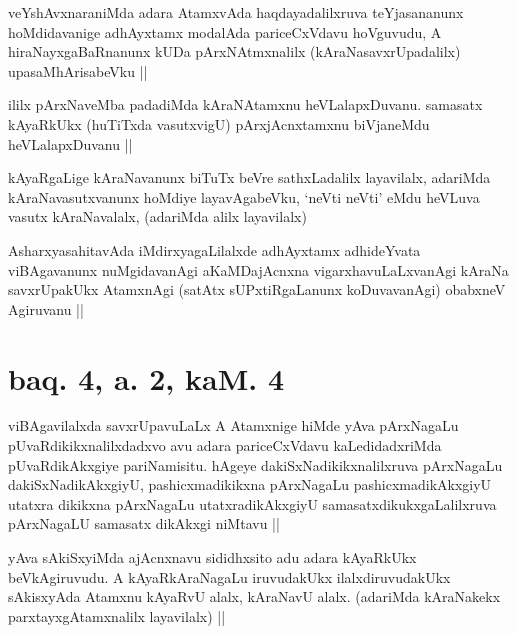 
\begin{artha}
veYshAvxnaraniMda adara AtamxvAda haqdayadalilxruva teYjasananunx hoMdidavanige adhAyxtamx modalAda pariceCxVdavu hoVguvudu, A hiraNayxgaBaRnanunx kUDa pArxNAtmxnalilx (kAraNasavxrUpadalilx) upasaMhArisabeVku ||
\end{artha}


\begin{artha}
ililx pArxNaveMba padadiMda kAraNAtamxnu heVLalapxDuvanu. samasatx kAyaRkUkx (huTiTxda vasutxvigU) pArxjAcnxtamxnu biVjaneMdu heVLalapxDuvanu ||
\end{artha}


\begin{artha}
kAyaRgaLige kAraNavanunx biTuTx beVre sathxLadalilx layavilalx, adariMda kAraNavasutxvanunx hoMdiye layavAgabeVku, `neVti neVti' eMdu heVLuva vasutx kAraNavalalx, (adariMda alilx layavilalx)
\end{artha}


\begin{artha}
AsharxyasahitavAda iMdirxyagaLilalxde adhAyxtamx adhideYvata viBAgavanunx nuMgidavanAgi aKaMDajAcnxna vigarxhavuLaLxvanAgi kAraNa savxrUpakUkx AtamxnAgi (satAtx sUPxtiRgaLanunx koDuvavanAgi) obabxneV Agiruvanu ||
\end{artha}

\section*{baq. 4, a. 2, kaM. 4}

\begin{artha}
viBAgavilalxda savxrUpavuLaLx A Atamxnige hiMde yAva pArxNagaLu pUvaRdikikxnalilxdadxvo avu adara pariceCxVdavu kaLedidadxriMda pUvaRdikAkxgiye pariNamisitu. hAgeye dakiSxNadikikxnalilxruva pArxNagaLu dakiSxNadikAkxgiyU, pashicxmadikikxna pArxNagaLu pashicxmadikAkxgiyU utatxra dikikxna pArxNagaLu utatxradikAkxgiyU samasatxdikukxgaLalilxruva pArxNagaLU samasatx dikAkxgi niMtavu ||
\end{artha}

\begin{artha}
yAva sAkiSxyiMda ajAcnxnavu sididhxsito adu adara kAyaRkUkx beVkAgiruvudu. A kAyaRkAraNagaLu iruvudakUkx ilalxdiruvudakUkx sAkisxyAda Atamxnu kAyaRvU alalx, kAraNavU alalx. (adariMda kAraNakekx parxtayxgAtamxnalilx layavilalx) || 
\end{artha}

